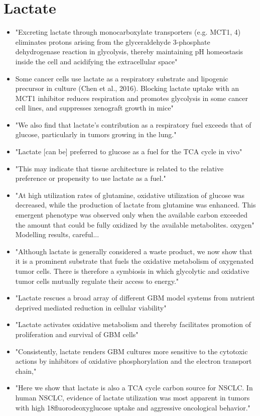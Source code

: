 \documentclass[11pt,a4paper]{article}
\begin{document}
\section{Lactate}
\begin{itemize}
\item "Excreting lactate through monocarboxylate transporters (e.g. MCT1, 4) eliminates protons arising from the glyceraldehyde 3-phosphate dehydrogenase reaction in glycolysis, thereby maintaining pH homeostasis inside the cell and acidifying the extracellular space"\cite{Faubert2017}
\item Some cancer cells use lactate as a respiratory substrate and lipogenic precursor in culture (Chen et al., 2016). Blocking lactate uptake with an MCT1 inhibitor reduces respiration and promotes glycolysis in some cancer cell lines, and suppresses xenograft growth in mice"\cite{Faubert2017}
\item "We also find that lactate’s contribution as a respiratory fuel exceeds that of glucose, particularly in tumors growing in the lung."\cite{Faubert2017}
\item "Lactate [can be] preferred to glucose as a fuel for the TCA cycle in vivo" \cite{Faubert2017}
\item "This may indicate that tissue architecture is related to the relative preference or propensity to use lactate as a fuel."\cite{Faubert2017}
\item "At high utilization rates of glutamine, oxidative utilization of glucose was decreased, while the production of lactate from glutamine was enhanced. This emergent phenotype was observed only when the available carbon exceeded the amount that could be fully oxidized by the available metabolites. oxygen"\cite{Damiani2017} Modelling results, careful...
\item "Although lactate is generally considered a waste product, we now show that it is a prominent substrate that fuels the oxidative metabolism of oxygenated tumor cells. There is therefore a symbiosis in which glycolytic and oxidative tumor cells mutually regulate their access to energy." \cite{Sonveaux2009}
\item "Lactate rescues a broad array of different GBM model systems from nutrient deprived mediated reduction in cellular viability"\cite{Torrini2022}
\item "Lactate activates oxidative metabolism and thereby facilitates promotion of proliferation and survival of GBM cells"\cite{Torrini2022}
\item "Consistently, lactate renders GBM cultures more sensitive to the cytotoxic actions by inhibitors of oxidative phosphorylation and the electron transport chain,"\cite{Torrini2022}
\item "Here we show that lactate is also a TCA cycle carbon source for NSCLC. In human NSCLC, evidence of lactate utilization was most apparent in tumors with high 18fluorodeoxyglucose uptake and aggressive oncological behavior." \cite{Faubert2017}
\end{itemize}
\end{document}
